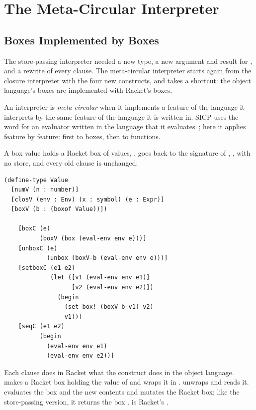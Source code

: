 \section{The Meta-Circular Interpreter}
\label{sec:metacirc}

\subsection{Boxes Implemented by Boxes}

The store-passing interpreter needed a new type, a new argument and result for , and a rewrite of every clause. The meta-circular interpreter starts again from the closure interpreter with the four new constructs, and takes a shortcut: the object language's boxes are implemented with Racket's boxes.

\begin{definition}
An interpreter is \emph{meta-circular} when it implements a feature of the language it interprets by the same feature of the language it is written in. SICP uses the word for an evaluator written in the language that it evaluates~\cite[Section~4.1]{SICP}; here it applies feature by feature: first to boxes, then to functions.
\end{definition}

A box value holds a Racket box of values, .  goes back to the signature of , , with no store, and every old clause is unchanged:
\begin{lstlisting}
(define-type Value
  [numV (n : number)]
  [closV (env : Env) (x : symbol) (e : Expr)]
  [boxV (b : (boxof Value))])

    [boxC (e)
          (boxV (box (eval-env env e)))]
    [unboxC (e)
            (unbox (boxV-b (eval-env env e)))]
    [setboxC (e1 e2)
             (let ([v1 (eval-env env e1)]
                   [v2 (eval-env env e2)])
               (begin
                 (set-box! (boxV-b v1) v2)
                 v1))]
    [seqC (e1 e2)
          (begin
            (eval-env env e1)
            (eval-env env e2))]
\end{lstlisting}
Each clause does in Racket what the construct does in the object language.  makes a Racket box holding the value of  and wraps it in .  unwraps and reads it.  evaluates the box and the new contents and mutates the Racket box; like the store-passing version, it returns the box .  is Racket's .

